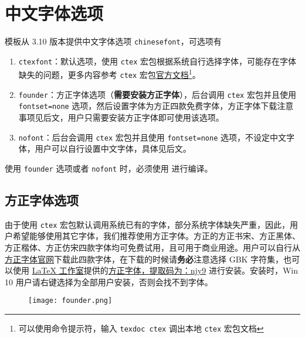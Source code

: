 \documentclass[lang=cn,10pt]{elegantbook}
\begin{document}
\section{中文字体选项}
模板从 3.10 版本提供中文字体选项 \lstinline{chinesefont}，可选项有
\begin{enumerate}
\item \lstinline{ctexfont}：默认选项，使用 \lstinline{ctex} 宏包根据系统自行选择字体，可能存在字体缺失的问题，更多内容参考 \lstinline{ctex} 宏包\href{https://ctan.org/pkg/ctex}{官方文档}\footnote{可以使用命令提示符，输入 \lstinline{texdoc ctex} 调出本地 \lstinline{ctex} 宏包文档}。
\item \lstinline{founder}：方正字体选项（\textbf{需要安装方正字体}），后台调用 \lstinline{ctex} 宏包并且使用 \lstinline{fontset=none} 选项，然后设置字体为方正四款免费字体，方正字体下载注意事项见后文，用户只需要安装方正字体即可使用该选项。
\item \lstinline{nofont}：后台会调用 \lstinline{ctex} 宏包并且使用 \lstinline{fontset=none} 选项，不设定中文字体，用户可以自行设置中文字体，具体见后文。
\end{enumerate}

\begin{remark}
  使用 \lstinline{founder} 选项或者 \lstinline{nofont} 时，必须使用  进行编译。
\end{remark}

\subsection{方正字体选项}
由于使用 \lstinline{ctex} 宏包默认调用系统已有的字体，部分系统字体缺失严重，因此，用户希望能够使用其它字体，我们推荐使用方正字体。方正的{\songti 方正书宋}、{\heiti 方正黑体}、{\kaishu 方正楷体}、{\fangsong 方正仿宋}四款字体均可免费试用，且可用于商业用途。用户可以自行从\href{http://www.foundertype.com/}{方正字体官网}下载此四款字体，在下载的时候请\textbf{务必}注意选择 GBK 字符集，也可以使用 \href{https://www.latexstudio.net/}{\LaTeX{} 工作室}提供的\href{https://pan.baidu.com/s/1BgbQM7LoinY7m8yeP25Y7Q}{方正字体，提取码为：njy9} 进行安装。安装时，{\kaishu Win 10 用户请右键选择为全部用户安装，否则会找不到字体。}

\begin{figure}[!htb]
\centering
\texttt{[image: founder.png]}
\end{figure}
\end{document}
